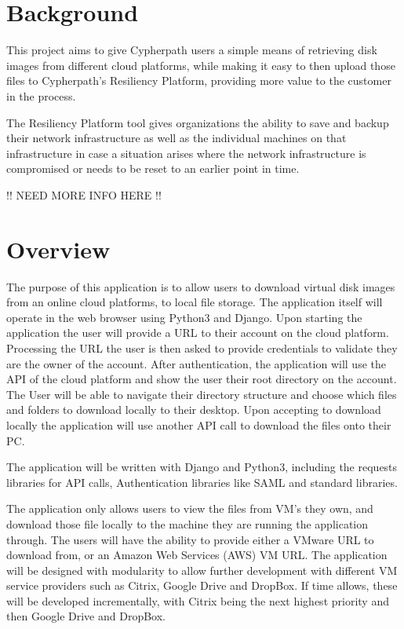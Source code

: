 \documentclass{article}
\begin{document}
    \section{Background}
	This project aims to give Cypherpath users a simple means of retrieving disk images from different cloud platforms, while making it easy to 
	then upload those files to Cypherpath's Resiliency Platform, providing more value to the customer in the process.

	The Resiliency Platform tool gives organizations the ability to save and backup their network infrastructure as well as the individual machines on that infrastructure in case a situation
	arises where the network infrastructure is compromised or needs to be reset to an earlier point in time.
	
	!! NEED MORE INFO HERE !!
	
    \section{Overview}
    The purpose of this application is to allow users to download virtual disk images from an online cloud platforms, to local file storage.
    The application itself will operate in the web browser using Python3 and Django. Upon starting the application the user will
    provide a URL to their account on the cloud platform. Processing the URL the user is then asked to provide credentials to validate they are the owner of
    the account. After authentication, the application will use the API of the cloud platform and show the user their root directory on the account.
    The User will be able to navigate their directory structure and choose which files and folders to download locally to their desktop.
    Upon accepting to download locally the application will use another API call to download the files onto their PC.

    The application will be written with Django and Python3, including the requests libraries for API calls, Authentication libraries like SAML
    and standard libraries.

    The application only allows users to view the files from VM's they own, and download those file locally to the machine they 
    are running the application through. The users will have the ability to provide either a VMware URL to download from, or an
    Amazon Web Services (AWS) VM URL. The application will be designed with modularity to allow further development with different 
	VM service providers such as Citrix, Google Drive and DropBox. If time allows, these will be developed incrementally, with 
	Citrix being the next highest priority and then Google Drive and DropBox.
\end{document}
